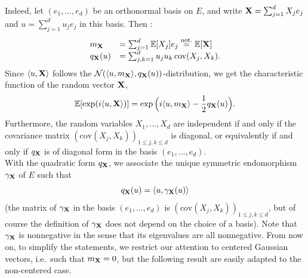 \documentclass[../Main.tex]{subfiles}
\begin{document}
Indeed, let $(e_1,\dots,e_d)$ be an orthonormal basis on $E$, and write $\mathbf{X}=\sum_{j=1}^d X_j e_j$ and $u=\sum_{j=1}^d u_j e_j$ in this basis. Then :
\[
\begin{array}{ll}
    m_{\mathbf{X}}    &= \sum_{j=1}^d \mathbb{E}[X_j]e_j \overset{\text{not.}}{=} \mathbb{E}[\mathbf{X}] \\
    q_{\mathbf{X}}(u) &= \sum_{j,k=1}^d u_j u_k\,\mathrm{cov}(X_j,X_k).
\end{array}
\]
Since $\langle u,\mathbf{X}\rangle$ follows the $\mathcal N(\langle u,m_{\mathbf{X}}\rangle, q_{\mathbf{X}}(u))$-distribution, we get the characteristic function of the random vector $\mathbf{X}$,
\begin{equation*}
\mathbb{E}[\exp(i\langle u,\mathbf{X}\rangle)] = \exp\Big(i\langle u,m_{\mathbf{X}}\rangle - \frac{1}{2} q_{\mathbf{X}}(u)\Big). 
\end{equation*}
Furthermore, the random variables $X_1,\dots,X_d$ are independent if and only if the covariance matrix $(\mathrm{cov}(X_j,X_k))_{1\leq j,k\leq d}$ is diagonal, or equivalently if and only if $q_{\mathbf{X}}$ is of diagonal form in the basis $(e_1,\dots,e_d)$.\\
With the quadratic form $q_{\mathbf{X}}$, we associate the unique symmetric endomorphism $\gamma_{\mathbf{X}}$ of $E$ such that
\[q_{\mathbf{X}}(u) = \langle u, \gamma_{\mathbf{X}}(u)\rangle\] 
(the matrix of $\gamma_{\mathbf{X}}$ in the basis $(e_1,\dots,e_d)$ is $(\mathrm{cov}(X_j,X_k))_{1\leq j,k\leq d}$, but of course the definition of $\gamma_{\mathbf{X}}$ does not depend on the choice of a basis). Note that $\gamma_{\mathbf{X}}$ is nonnegative in the sense that its eigenvalues are all nonnegative.
From now on, to simplify the statements, we restrict our attention to centered Gaussian vectors, i.e.\ such that $m_{\mathbf{X}}=0$, but the following result are easily adapted to the non-centered case.
\end{document}
